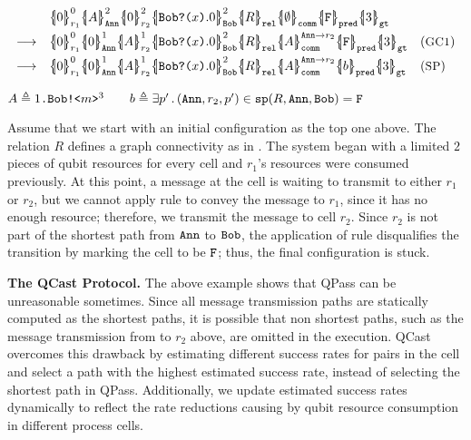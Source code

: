 {\footnotesize
\begin{center}
\[
\begin{array}{lll}
&
\pcellb{0}{0}{r_1}
\pcellb{A}{2}{\cn{Ann}}
\pcellb{0}{2}{r_2}
\pcellb{\qrev{\cn{Bob}}{x}.0}{2}{\cn{Bob}}
\qcellb{R}{\cn{rel}}
\qcellb{\emptyset}{\cn{comm}}
\qcellb{\cn{F}}{\cn{pred}}
\qcellb{3}{\cn{gt}}
\\[0.5em]
\longrightarrow
&
\pcellb{0}{0}{r_1}
\pcellb{0}{1}{\cn{Ann}}
\pcellb{A}{1}{r_2}
\pcellb{\qrev{\cn{Bob}}{x}.0}{2}{\cn{Bob}}
\qcellb{R}{\cn{rel}}
\pcellb{A}{\cn{Ann} \rightarrow r_2}{\cn{comm}}
\qcellb{\cn{F}}{\cn{pred}}
\qcellb{3}{\cn{gt}}
&
(\rulelab{GC1})
\\[0.5em]
\longrightarrow
&
\pcellb{0}{0}{r_1}
\pcellb{0}{1}{\cn{Ann}}
\pcellb{A}{1}{r_2}
\pcellb{\qrev{\cn{Bob}}{x}.0}{2}{\cn{Bob}}
\qcellb{R}{\cn{rel}}
\pcellb{A}{\cn{Ann} \rightarrow r_2}{\cn{comm}}
\qcellb{b}{\cn{pred}}
\qcellb{3}{\cn{gt}}
&
(\rulelab{SP})
\end{array}
\]
\end{center}
}
{\footnotesize
\begin{center}
$A\triangleq1\texttt{.}\texttt{Bob}\texttt{!<}m\texttt{>}^3
\qquad
b\triangleq\exists p'\,.\,(\texttt{Ann},r_2,p')\in \texttt{sp}(R,\texttt{Ann},\texttt{Bob})=\texttt{F}
$
\end{center}
}

Assume that we start with an initial configuration as the top one above.
The relation $R$ defines a graph connectivity as in .
The system began with a limited $2$ pieces of qubit resources for every cell 
and $r_1$'s resources were consumed previously. 
At this point, a message at the  cell is waiting to transmit to either $r_1$ or $r_2$,
but we cannot apply rule  to convey the message to $r_1$, since it has no enough resource; therefore, we transmit
the message to cell $r_2$.
Since $r_2$ is not part of the shortest path from $\texttt{Ann}$ to $\texttt{Bob}$, the application of rule  disqualifies the transition by marking the  cell to be $\texttt{F}$; thus, the final configuration is stuck.

\noindent\textbf{The QCast Protocol.}
The above example shows that QPass can be unreasonable sometimes.
Since all message transmission paths are statically computed as the shortest paths,
it is possible that non shortest paths, such as the message transmission from  to $r_2$ above, are omitted in the execution.
QCast overcomes this drawback by estimating different success rates for pairs in the  cell
and select a path with the highest estimated success rate, instead of selecting the shortest path in QPass.
Additionally, we update estimated success rates dynamically to reflect the rate reductions causing by qubit resource
consumption in different process cells.

